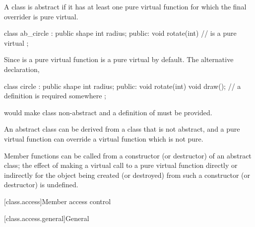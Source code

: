 \pnum
{}%
A class is abstract if it has at least one pure virtual
function for which the final overrider is pure virtual.
\begin{example}
\begin{codeblock}
class ab_circle : public shape {
  int radius;
public:
  void rotate(int) { }
  //  is a pure virtual
};
\end{codeblock}

Since  is a pure virtual function
 is a pure virtual by default. The alternative
declaration,
\begin{codeblock}
class circle : public shape {
  int radius;
public:
  void rotate(int) { }
  void draw();                  // a definition is required somewhere
};
\end{codeblock}
would make class  non-abstract and a definition of
 must be provided.
\end{example}

\pnum
\begin{note}
An abstract class can be derived from a class that is not abstract, and
a pure virtual function can override a virtual function which is not
pure.
\end{note}

\pnum
{}%
Member functions can be called from a constructor (or destructor) of an
abstract class;
%
the effect of making a virtual call to a pure
virtual function directly or indirectly for the object being created (or
destroyed) from such a constructor (or destructor) is undefined.%

[class.access]{Member access control}%

[class.access.general]{General}%


